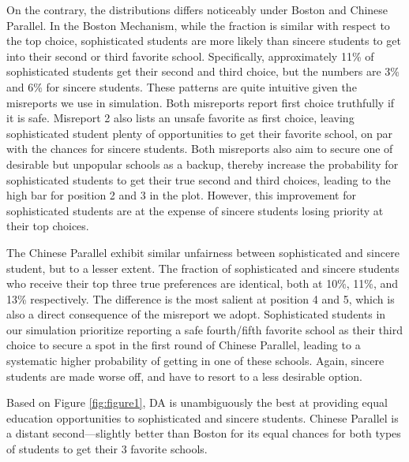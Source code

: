 \documentclass[10pt, reqno]{amsart}
\begin{document}
On the contrary, the distributions differs noticeably under Boston and Chinese Parallel. In the Boston Mechanism, while the fraction is similar with respect to the top choice, sophisticated students are more likely than sincere students to get into their second or third favorite school. Specifically, approximately 11\% of sophisticated students get their second and third choice, but the numbers are 3\% and 6\% for sincere students. These patterns are quite intuitive given the misreports we use in simulation. Both misreports report first choice truthfully if it is safe. Misreport 2 also lists an unsafe favorite as first choice, leaving sophisticated student plenty of opportunities to get their favorite school, on par with the chances for sincere students. Both misreports also aim to secure one of desirable but unpopular schools as a backup, thereby increase the probability for sophisticated students to get their true second and third choices, leading to the high bar for position 2 and 3 in the plot. However, this improvement for sophisticated students are at the expense of sincere students losing priority at their top choices. 

The Chinese Parallel exhibit similar unfairness between sophisticated and sincere student, but to a lesser extent. The fraction of sophisticated and sincere students who receive their top three true preferences are identical, both at 10\%, 11\%, and 13\% respectively. The difference is the most salient at position 4 and 5, which is also a direct consequence of the misreport we adopt. Sophisticated students in our simulation prioritize reporting a safe fourth/fifth favorite school as their third choice to secure a spot in the first round of Chinese Parallel, leading to a systematic higher probability of getting in one of these schools. Again, sincere students are made worse off, and have to resort to a less desirable option. 

Based on Figure \ref{fig:figure1}, DA is unambiguously the best at providing equal education opportunities to sophisticated and sincere students. Chinese Parallel is a distant second---slightly better than Boston for its equal chances for both types of students to get their 3 favorite schools.
\end{document}
